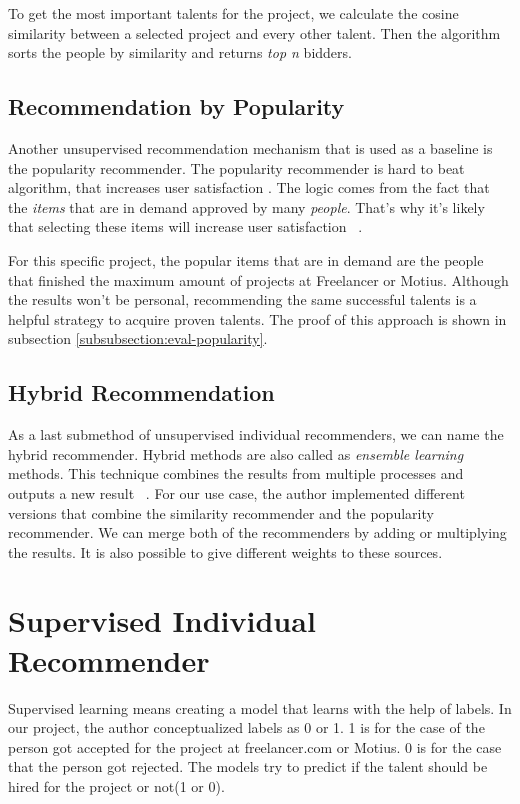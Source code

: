 To get the most important talents for the project, we calculate the cosine similarity between a selected project and every other talent. Then the algorithm sorts the people by similarity and returns \textit{top n} bidders.



\subsection{Recommendation by Popularity}


Another unsupervised recommendation mechanism that is used as a baseline is the popularity recommender. The popularity recommender is hard to beat algorithm, that increases user satisfaction \cite{amatriain2015recommender}. The logic comes from the fact that the \textit{items} that are in demand approved by many \textit{people}. That's why it's likely that selecting these items will increase user satisfaction ~\parencite{amatriain2015recommender}. 


For this specific project, the popular items that are in demand are the people that finished the maximum amount of projects at Freelancer or Motius. Although the results won't be personal, recommending the same successful talents is a helpful strategy to acquire proven talents. The proof of this approach is shown in subsection \ref{subsubsection:eval-popularity}.


\subsection{Hybrid Recommendation}\label{section:hybrid}

As a last submethod of unsupervised individual recommenders, we can name the hybrid recommender. Hybrid methods are also called as \textit{ensemble learning} methods. This technique combines the results from multiple processes and outputs a new result ~\parencite{beliakov2015aggregation}. For our use case, the author implemented different versions that combine the similarity recommender and the popularity recommender. We can merge both of the recommenders by adding or multiplying the results. It is also possible to give different weights to these sources.


\section{Supervised Individual Recommender}\label{section:supervised}

Supervised learning means creating a model that learns with the help of labels. In our project, the author conceptualized labels as 0 or 1. 1 is for the case of the person got accepted for the project at freelancer.com or Motius. 0 is for the case that the person got rejected. The models try to predict if the talent should be hired for the project or not(1 or 0).


